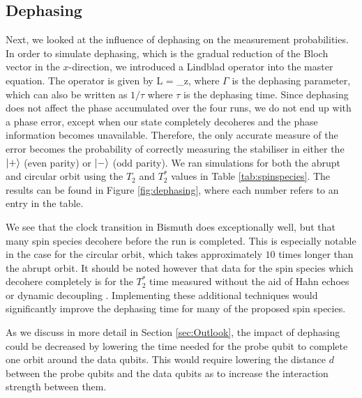 \subsection{Dephasing}
Next, we looked at the influence of dephasing on the measurement probabilities. In order to simulate dephasing, which is the gradual reduction of the Bloch vector in the $x$-direction, we introduced a Lindblad operator into the master equation. The operator is given by 
\beq
L  = \sqrt{\Gamma} \sigma_z,
\eeq
where $\Gamma$ is the dephasing parameter, which can also be written as $1/\tau$ where $\tau$ is the dephasing time. Since dephasing does not affect the phase accumulated over the four runs, we do not end up with a phase error, except when our state completely decoheres and the phase information becomes unavailable. Therefore, the only accurate measure of the error becomes the probability of correctly measuring the stabiliser in either the $\ket{+}$ (even parity) or $\ket{-}$ (odd parity). We ran simulations for both the abrupt and circular orbit using the $T_2$ and $T_2^*$ values in Table \ref{tab:spinspecies}. The results can be found in Figure \ref{fig:dephasing}, where each number refers to an entry in the table. 

We see that the clock transition in Bismuth does exceptionally well, but that many spin species decohere before the run is completed. This is especially notable in the case for the circular orbit, which takes approximately $10$ times longer than the abrupt orbit. It should be noted however that data for the spin species which decohere completely is for the $T_2^*$ time measured without the aid of Hahn echoes \cite{hahn} or dynamic decoupling \cite{something}. Implementing these additional techniques would significantly improve the dephasing time for many of the proposed spin species. 

As we discuss in more detail in Section \ref{sec:Outlook}, the impact of dephasing could be decreased by lowering the time needed for the probe qubit to complete one orbit around the data qubits. This would require lowering the distance $d$ between the probe qubits and the data qubits as to increase the interaction strength between them. 


